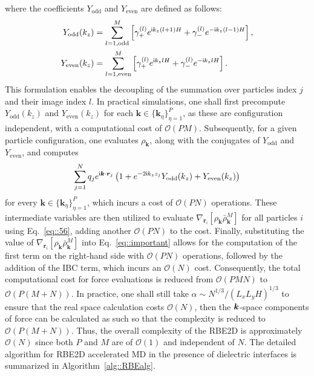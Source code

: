  {where the coefficients $Y_{\text{odd}}$ and $Y_{\text{even}}$ are defined as follows: 
\begin{equation}
    \begin{split}
        Y_{\text{odd}}(k_z) &= \sum_{\substack{l=1, \text{odd}}}^{M}\left[\gamma_{+}^{(l)}e^{\mathsf i k_z(l+1) H}+\gamma_{-}^{(l)}e^{-\mathsf i k_z (l-1)H}\right], \\ 
        Y_{\text{even}}(k_z) &= \sum_{\substack{l=1, \text{even}}}^{M}\left[\gamma_{+}^{(l)}e^{\mathsf i k_zl H}+\gamma_{-}^{(l)}e^{-\mathsf i k_z l H}\right].
    \end{split}
\end{equation}
This formulation enables the decoupling of the summation over particles index $j$ and their image index $l$. 
In practical simulations, one shall first precompute $Y_{\text{odd}}(k_z)$ and $Y_{\text{even}}(k_z)$ for each $\bm{k} \in \{\bm{k}_{\eta}\}_{\eta=1}^{P}$, as these are configuration independent, with a computational cost of $\mathcal{O}(PM)$. 
Subsequently, for a given particle configuration, one evaluates $\rho_{\bm{k}}$, along with the conjugates of $Y_{\text{odd}}$ and $Y_{\text{even}}$, and computes
\begin{equation}
    \sum_{j=1}^{N}q_je^{\mathsf i\bm{k}\cdot\bm{r}_{j}}\left(1+e^{-2\mathsf i k_zz_j}Y_{\text{odd}}(k_z)+Y_{\text{even}}(k_z)\right)
\end{equation}
for every $\bm{k}\in\{\bm{k}_{\eta}\}_{\eta=1}^{P}$, which incurs a cost of $\mathcal{O}(PN)$ operations. These intermediate variables are then utilized to evaluate $\nabla_{\bm{r}_i}\left[\rho_{\bm{k}}\bar{\rho}_{\bm{k}}^{M}\right]$ for all particles $i$ using Eq.~\eqref{eq::56}, adding another $\mathcal O(PN)$ to the cost. Finally, substituting the value of $\nabla_{\bm{r}_i}\left[\rho_{\bm{k}}\bar{\rho}_{\bm{k}}^{M}\right]$ into Eq.~\eqref{eq::important} allows for the computation of the first term on the right-hand side with $\mathcal{O}(PN)$ operations, followed by the addition of the IBC term, which incurs an $\mathcal{O}(N)$ cost. Consequently, the total computational cost for force evaluations is reduced from $\mathcal O(PMN)$ to $\mathcal O(P(M+N))$.
In practice, one shall still take $\alpha \sim N^{1/3}/(L_xL_yH)^{1/3}$ to ensure that the real space calculation costs $\mathcal{O}(N)$, then the $\boldsymbol{k}$-space components of force can be calculated as such so that the complexity is reduced to $\mathcal{O}(P(M+N))$.}
Thus, the overall complexity of the RBE2D is approximately $\mathcal{O}(N)$ since both $P$ and $M$ are of $\mathcal O(1)$ and independent   {of} $N$.
The detailed algorithm for RBE2D accelerated MD in the presence of dielectric interfaces is summarized in Algorithm~\ref{alg::RBEalg}.

